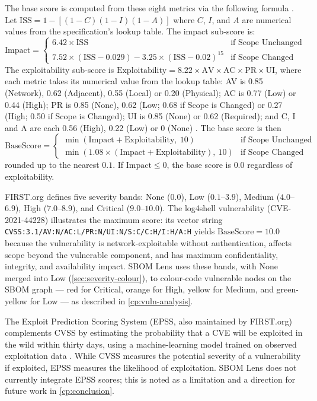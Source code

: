 The base score is computed from these eight metrics via the following formula \citep{CVSS31}. Let \(\mathrm{ISS} = 1 - [(1 - C)(1 - I)(1 - A)]\) where \(C\), \(I\), and \(A\) are numerical values from the specification's lookup table. The impact sub-score is:
\[
    \mathrm{Impact} =
    \begin{cases}
        6.42 \times \mathrm{ISS} & \text{if Scope Unchanged} \\
        7.52 \times (\mathrm{ISS} - 0.029) - 3.25 \times (\mathrm{ISS} - 0.02)^{15} & \text{if Scope Changed}
    \end{cases}
\]
The exploitability sub-score is \(\mathrm{Exploitability} = 8.22 \times \mathrm{AV} \times \mathrm{AC} \times \mathrm{PR} \times \mathrm{UI}\), where each metric takes its numerical value from the lookup table: AV is 0.85 (Network), 0.62 (Adjacent), 0.55 (Local) or 0.20 (Physical); AC is 0.77 (Low) or 0.44 (High); PR is 0.85 (None), 0.62 (Low; 0.68 if Scope is Changed) or 0.27 (High; 0.50 if Scope is Changed); UI is 0.85 (None) or 0.62 (Required); and C, I and A are each 0.56 (High), 0.22 (Low) or 0 (None) \citep{CVSS31}. The base score is then
\[
    \mathrm{BaseScore} =
    \begin{cases}
        \min(\mathrm{Impact} + \mathrm{Exploitability},\ 10) & \text{if Scope Unchanged} \\
        \min(1.08 \times (\mathrm{Impact} + \mathrm{Exploitability}),\ 10) & \text{if Scope Changed}
    \end{cases}
\]
rounded up to the nearest \(0.1\). If \(\mathrm{Impact} \le 0\), the base score is \(0.0\) regardless of exploitability.

FIRST.org defines five severity bands: None (\(0.0\)), Low (\(0.1\)--\(3.9\)), Medium (\(4.0\)--\(6.9\)), High (\(7.0\)--\(8.9\)), and Critical (\(9.0\)--\(10.0\)). The log4shell vulnerability (CVE-2021-44228) illustrates the maximum score: its vector string \texttt{CVSS:3.1/AV:N/AC:L/PR:N/UI:N/S:C/C:H/I:H/A:H} yields \(\mathrm{BaseScore} = 10.0\) because the vulnerability is network-exploitable without authentication, affects scope beyond the vulnerable component, and has maximum confidentiality, integrity, and availability impact. SBOM Lens uses these bands, with None merged into Low (\autoref{sec:severity-colour}), to colour-code vulnerable nodes on the SBOM graph --- red for Critical, orange for High, yellow for Medium, and green-yellow for Low --- as described in \autoref{cp:vuln-analysis}.

The Exploit Prediction Scoring System (EPSS, also maintained by FIRST.org) complements CVSS by estimating the probability that a CVE will be exploited in the wild within thirty days, using a machine-learning model trained on observed exploitation data \citep{EPSS}. While CVSS measures the potential severity of a vulnerability if exploited, EPSS measures the likelihood of exploitation. SBOM Lens does not currently integrate EPSS scores; this is noted as a limitation and a direction for future work in \autoref{cp:conclusion}.
